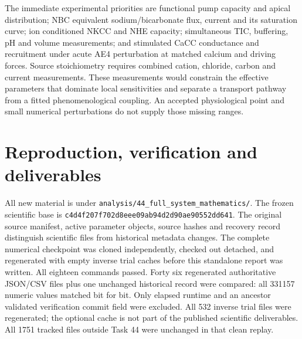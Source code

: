 The immediate experimental priorities are functional pump capacity and
apical distribution; NBC equivalent sodium/bicarbonate flux, current and
its saturation curve; ion conditioned NKCC and NHE capacity; simultaneous
TIC, buffering, pH and volume measurements; and stimulated CaCC conductance
and recruitment under acute AE4 perturbation at matched calcium and driving
forces. Source stoichiometry requires combined cation, chloride, carbon and
current measurements. These measurements would constrain the effective
parameters that dominate local sensitivities and separate a transport
pathway from a fitted phenomenological coupling. An accepted physiological
point and small numerical perturbations do not supply those missing ranges.

\section{Reproduction, verification and deliverables}
All new material is under \texttt{analysis/44\_full\_system\_mathematics/}.
The frozen scientific base is
\nolinkurl{c4d4f207f702d8eee09ab94d2d90ae90552dd641}.
The original source manifest, active parameter objects, source hashes and
recovery record distinguish scientific files from historical metadata changes.
The complete numerical checkpoint was cloned independently, checked out
detached, and regenerated with empty inverse trial caches before this
standalone report was written. All eighteen commands passed. Forty six
regenerated authoritative JSON/CSV files plus one unchanged historical
record were compared: all 331157 numeric values matched bit for bit.
Only elapsed runtime and an ancestor validated verification commit field
were excluded. All 532 inverse trial files were regenerated; the optional
cache is not part of the published scientific deliverables. All 1751 tracked
files outside Task 44 were unchanged in that clean replay.

